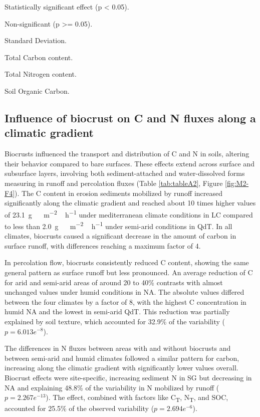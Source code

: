 \begin{table}[htbp]
\begin{threeparttable}
\begin{tablenotes}
      \item[*] Statistically significant effect (p < 0.05).
      \item[ns] Non-significant (p >= 0.05).
      \item[SD] Standard Deviation.
      \item[C\textsubscript{T}] Total Carbon content.
      \item[N\textsubscript{T}] Total Nitrogen content.
      \item[SOC] Soil Organic Carbon.
    \end{tablenotes}
  \end{threeparttable}
\end{table}

\subsection{Influence of biocrust on C and N fluxes along a climatic gradient}

Biocrusts influenced the transport and distribution of C and N in soils, altering their behavior compared to bare surfaces. These effects extend across surface and subsurface layers, involving both sediment-attached and water-dissolved forms measuring in runoff and percolation fluxes (Table \ref{tab:tableA2}, Figure \ref{fig:M2-F4}). The C content in erosion sediments mobilized by runoff increased significantly along the climatic gradient and reached about 10 times higher values of \SI{23.1}{\gram{}\,\metre^{-2}\,\hour^{-1}} under mediterranean climate conditions in LC compared to less than \SI{2.0}{\gram{}\,\metre^{-2}\,\hour^{-1}} under semi-arid conditions in QdT. In all climates, biocrusts caused a significant decrease in the amount of carbon in surface runoff, with differences reaching a maximum factor of 4.
 
In percolation flow, biocrusts consistently reduced C content, showing the same general pattern as surface runoff but less pronounced. An average reduction of C for arid and semi-arid areas of around 20 to 40\% contrasts with almost unchanged values under humid conditions in NA. The absolute values differed between the four climates by a factor of 8, with the highest C concentration in humid NA and the lowest in semi-arid QdT. This reduction was partially explained by soil texture, which accounted for 32.9\% of the variability ($p = 6.013e^{-8}$).

The differences in N fluxes between areas with and without biocrusts and between semi-arid and humid climates followed a similar pattern for carbon, increasing along the climatic gradient with significantly lower values overall. Biocrust effects were site-specific, increasing sediment N in SG but decreasing in NA and explaining 48.8\% of the variability in N mobilized by runoff ($p = 2.267e^{-13}$). The effect, combined with factors like C\textsubscript{T}, N\textsubscript{T}, and SOC, accounted for 25.5\% of the observed variability ($p = 2.694e^{-6}$).

